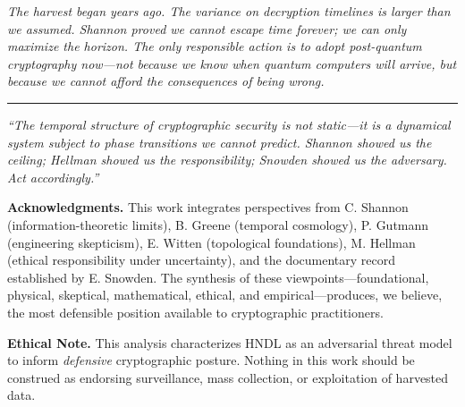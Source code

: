 \documentclass[11pt,a4paper]{article}
\begin{document}
\textit{The harvest began years ago. The variance on decryption timelines is larger than we assumed. Shannon proved we cannot escape time forever; we can only maximize the horizon. The only responsible action is to adopt post-quantum cryptography now---not because we know when quantum computers will arrive, but because we cannot afford the consequences of being wrong.}

\vspace{1em}
\hrule
\vspace{0.5em}
\small
\noindent\textit{``The temporal structure of cryptographic security is not static---it is a dynamical system subject to phase transitions we cannot predict. Shannon showed us the ceiling; Hellman showed us the responsibility; Snowden showed us the adversary. Act accordingly.''}

\vspace{2em}
\noindent\textbf{Acknowledgments.} This work integrates perspectives from C. Shannon (information-theoretic limits), B. Greene (temporal cosmology), P. Gutmann (engineering skepticism), E. Witten (topological foundations), M. Hellman (ethical responsibility under uncertainty), and the documentary record established by E. Snowden. The synthesis of these viewpoints---foundational, physical, skeptical, mathematical, ethical, and empirical---produces, we believe, the most defensible position available to cryptographic practitioners.

\vspace{1em}
\noindent\textbf{Ethical Note.} This analysis characterizes HNDL as an adversarial threat model to inform \textit{defensive} cryptographic posture. Nothing in this work should be construed as endorsing surveillance, mass collection, or exploitation of harvested data.
\end{document}
